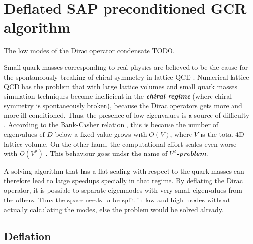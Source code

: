 \documentclass{article}
\theoremstyle{plain} %
\theoremstyle{convention} %
\theoremstyle{remark} %
\def\df#1{\textbf{\textit{#1}}}
\numberwithin{equation}{section}
\begin{document}
\section{Deflated SAP preconditioned GCR algorithm}

\label{sec:dfl_sap_gcr}

The low modes of the Dirac operator condensate TODO.

Small quark masses corresponding to real physics are believed to be the cause for the spontaneously breaking of chiral symmetry in lattice QCD \cite{banks1980}. Numerical lattice QCD has the problem that with large lattice volumes and small quark masses simulation techniques become inefficient in the \df{chiral regime} (where chiral symmetry is spontaneously broken), because the Dirac operators gets more and more ill-conditioned. Thus, the presence of low eigenvalues is a source of difficulty \cite{giusti2003}. According to the Bank-Casher relation \cite{banks1980}, this is because the number of eigenvalues of $D$ below a fixed value grows with $O(V)$, where $V$ is the total 4D lattice volume. On the other hand, the computational effort scales even worse with $O(V^2)$ \cite{luscher2007}. This behaviour goes under the name of \df{$V^2$-problem}.

A solving algorithm that has a flat scaling with respect to the quark masses can therefore lead to large speedups specially in that regime. By deflating the Dirac operator, it is possible to separate eigenmodes with very small eigenvalues from the others. Thus the space needs to be split in low and high modes without actually calculating the modes, else the problem would be solved already.

\subsection{Deflation}
\end{document}
